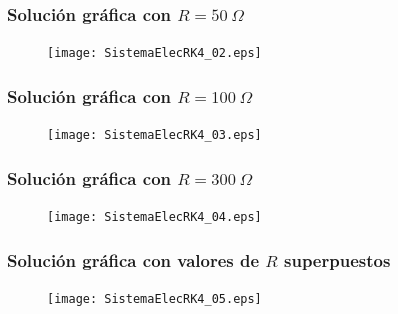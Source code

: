 \begin{frame}[plain]
\frametitle{Solución gráfica con $R = 50 \: \Omega$}
\begin{figure}
    \centering
    \texttt{[image: SistemaElecRK4\_02.eps]} 
\end{figure}
\end{frame}
\begin{frame}[plain]
\frametitle{Solución gráfica con $R = 100 \: \Omega$}
\begin{figure}
    \centering
    \texttt{[image: SistemaElecRK4\_03.eps]} 
\end{figure}
\end{frame}
\begin{frame}[plain]
\frametitle{Solución gráfica con $R = 300 \: \Omega$}
\begin{figure}
    \centering
    \texttt{[image: SistemaElecRK4\_04.eps]} 
\end{figure}
\end{frame}
\begin{frame}[plain]    
\frametitle{Solución gráfica con valores de $R$ superpuestos}
\begin{figure}
    \centering
    \texttt{[image: SistemaElecRK4\_05.eps]} 
\end{figure}
\end{frame}
